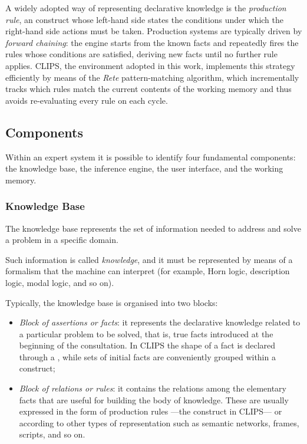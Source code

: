 A widely adopted way of representing declarative knowledge is the
\emph{production rule}, an  construct whose left-hand side states
the conditions under which the right-hand side actions must be taken. Production
systems are typically driven by \emph{forward chaining}: the engine starts from
the known facts and repeatedly fires the rules whose conditions are satisfied,
deriving new facts until no further rule applies. CLIPS, the environment adopted
in this work, implements this strategy efficiently by means of the
\emph{Rete} pattern-matching algorithm, which incrementally tracks which rules
match the current contents of the working memory and thus avoids re-evaluating
every rule on each cycle.


\subsection{Components}

Within an expert system it is possible to identify four fundamental components:
the knowledge base, the inference engine, the user interface, and the working
memory.

\subsubsection*{Knowledge Base}

The knowledge base represents the set of information needed to address and solve
a problem in a specific domain.

Such information is called \emph{knowledge}, and it must be represented by means
of a formalism that the machine can interpret (for example, Horn logic,
description logic, modal logic, and so on).

Typically, the knowledge base is organised into two blocks:

\begin{itemize}
    \item \emph{Block of assertions or facts}: it represents the declarative
    knowledge related to a particular problem to be solved, that is, true facts
    introduced at the beginning of the consultation. In CLIPS the shape of a
    fact is declared through a , while sets of initial facts
    are conveniently grouped within a  construct;

    \item \emph{Block of relations or rules}: it contains the relations among the
    elementary facts that are useful for building the body of knowledge. These
    are usually expressed in the form of production rules ---the 
    construct in CLIPS--- or according to other types of representation such as
    semantic networks, frames, scripts, and so on.
\end{itemize}

